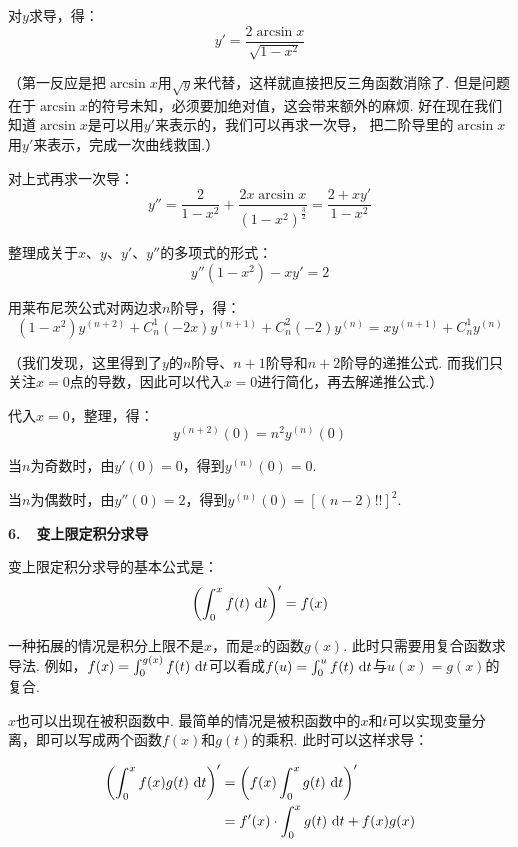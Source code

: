 \begin{solution}
对$y$求导，得：
$$
y' = \frac{2\arcsin x}{\sqrt{1-x^2}}
$$\par
（第一反应是把$\arcsin x$用$\sqrt{y}$来代替，这样就直接把反三角函数消除了.
 但是问题在于$\arcsin x$的符号未知，必须要加绝对值，这会带来额外的麻烦.
 好在现在我们知道$\arcsin x$是可以用$y'$来表示的，我们可以再求一次导，
 把二阶导里的$\arcsin x$用$y'$来表示，完成一次曲线救国.）\par

对上式再求一次导：
$$
y''=\frac{2}{1-x^2}+\frac{2x \arcsin x}{(1-x^2)^{\frac{3}{2}}} = \frac{2+xy'}{1-x^2}
$$\par
整理成关于$x$、$y$、$y'$、$y''$的多项式的形式：
$$
y''(1-x^2)-xy'=2
$$

用莱布尼茨公式对两边求$n$阶导，得：
$$
(1-x^2)y^{(n+2)} + C_{n}^{1}(-2x)y^{(n+1)} + C_{n}^{2}(-2)y^{(n)}
= xy^{(n+1)} + C_{n}^{1}y^{(n)}
$$\par
（我们发现，这里得到了$y$的$n$阶导、$n+1$阶导和$n+2$阶导的递推公式.
而我们只关注$x=0$点的导数，因此可以代入$x=0$进行简化，再去解递推公式.）\par
代入$x=0$，整理，得：
$$
y^{(n+2)}(0) = n^2 y^{(n)}(0)
$$\par
当$n$为奇数时，由$y'(0)=0$，得到$y^{(n)}(0) = 0$.\par
当$n$为偶数时，由$y''(0)=2$，得到$y^{(n)}(0)=[(n-2)!!]^2$.
\end{solution}

\textbf{6.~~变上限定积分求导}\vspace{0.25em}

变上限定积分求导的基本公式是：
$$
\setlength\abovedisplayskip{6pt}
\setlength\belowdisplayskip{6pt}
\left(  \int_{0}^{x}f(t)~\d t \right)' = f(x)
$$\par

一种拓展的情况是积分上限不是$x$，而是$x$的函数$g(x)$. 此时只需要用复合函数求导法.
例如，$f(x)=\int_{0}^{g(x)}f(t)~\mathrm{d} t$可以看成$f(u)=\int_{0}^{u}f(t)~\mathrm{d} t$与$u(x)=g(x)$的复合.\par
$x$也可以出现在被积函数中. 最简单的情况是被积函数中的$x$和$t$可以实现变量分离，即可以写成两个函数$f(x)$和$g(t)$的乘积. 此时可以这样求导：

\begin{equation}
    \setlength\abovedisplayskip{4pt}
    \setlength\belowdisplayskip{6pt}
    \begin{aligned}
        \left(  \int_{0}^{x}f(x)g(t)~\d t \right)'
        &= \left( f(x) \int_{0}^{x}g(t)~\d t \right)' \\
        &= f'(x)\cdot \int_{0}^{x}g(t)~\d t + f(x)g(x)
        \nonumber
    \end{aligned}
\end{equation}\par

